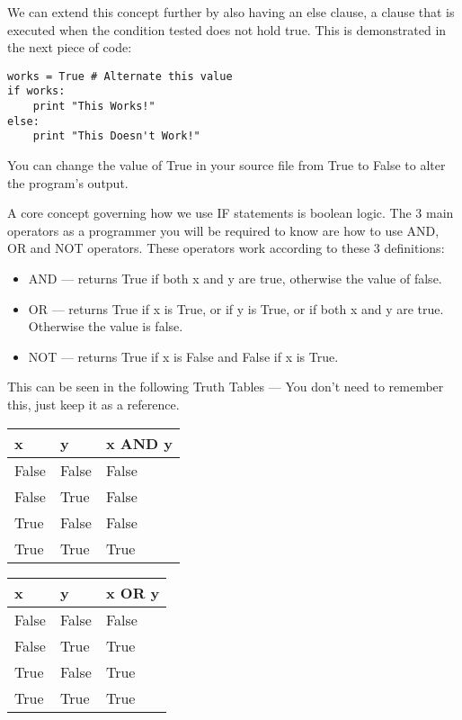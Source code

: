 \documentclass[twocolumn]{article}
\begin{document}
We can extend this concept further by also having an else clause, a clause that is executed when the condition tested does not hold true. This is demonstrated in the next piece of code:
\begin{lstlisting}
works = True # Alternate this value
if works:
	print "This Works!"
else:
	print "This Doesn't Work!"
\end{lstlisting}
You can change the value of True in your source file from True to False to alter the program's output.

A core concept governing how we use IF statements is boolean logic. The 3 main operators as a programmer you will be required to know are how to use AND, OR and NOT operators. These operators work according to these 3 definitions:
\begin{itemize}
	\item AND --- returns True if both x and y are true, otherwise the value of false. 
	\item OR --- returns True if x is True, or if y is True, or if both x and y are true. Otherwise the value is false.
	\item NOT --- returns True if x is False and False if x is True.
\end{itemize}
This can be seen in the following Truth Tables --- You don't need to remember this, just keep it as a reference.

\begin{center}
	\begin{tabular}{lll} 
		\toprule
		x & y & x AND y \\
		\midrule
		False & False & False \\
		False & True & False \\
		True & False & False \\
		True & True & True \\
		\bottomrule
	\end{tabular}
	\quad
	\begin{tabular}{lll} 
		\toprule
		x & y & x OR y \\
		\midrule
		False & False & False \\
		False & True & True \\
		True & False & True \\
		True & True & True \\
		\bottomrule
	\end{tabular}
\end{center}
\end{document}
